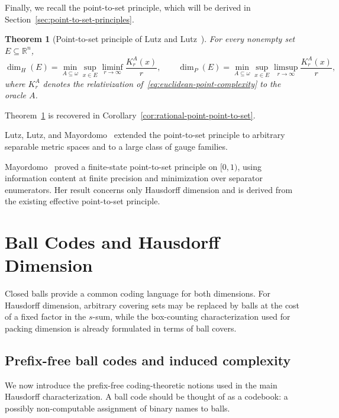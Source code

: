 \documentclass[a4paper,oneside,reqno,12pt]{amsart}
\theoremstyle{plain}
\newtheorem{theorem}{Theorem}[section]
\theoremstyle{definition}
\theoremstyle{remark}
\begin{document}
Finally, we recall the point-to-set principle, which will be derived in
Section~\ref{sec:point-to-set-principles}.
 
\begin{theorem}[Point-to-set principle of Lutz and Lutz~\cite{LutzLutz2018}]
\label{thm:lutz-lutz-point-to-set}
For every nonempty set \(E\subseteq\mathbb R^n\),
\[
\dim_H(E)
=
\min_{A\subseteq\omega}
\sup_{x\in E}
\liminf_{r\to\infty}\frac{K^A_r(x)}{r},
\qquad
\dim_P(E)
=
\min_{A\subseteq\omega}
\sup_{x\in E}
\limsup_{r\to\infty}\frac{K^A_r(x)}{r},
\]
where \(K^A_r\) denotes the relativization
of~\eqref{eq:euclidean-point-complexity} to the oracle \(A\).
\end{theorem}
 
Theorem~\ref{thm:lutz-lutz-point-to-set} is
recovered in Corollary~\ref{cor:rational-point-point-to-set}.

Lutz, Lutz, and Mayordomo~\cite{LutzLutzMayordomo2023} extended the
point-to-set principle to arbitrary separable metric spaces and to a large
class of gauge families.

Mayordomo~\cite{Mayordomo2025} proved a finite-state point-to-set principle on
\([0,1)\), using information content at finite precision and minimization over
separator enumerators.
Her result concerns only Hausdorff dimension and is derived from the existing effective point-to-set principle.

\section{Ball Codes and Hausdorff Dimension}
\label{sec:hausdorff-ball-codes}

Closed balls provide a common coding language for both dimensions.
For Hausdorff dimension, arbitrary covering sets may be replaced by
balls at the cost of a fixed factor in the \(s\)-sum, while the
box-counting characterization used for packing dimension is already
formulated in terms of ball covers.

\subsection{Prefix-free ball codes and induced complexity}

We now introduce the prefix-free coding-theoretic notions used in the main
Hausdorff characterization.
A ball code should be thought of as a codebook: a
possibly non-computable assignment of binary names to balls.
\end{document}
